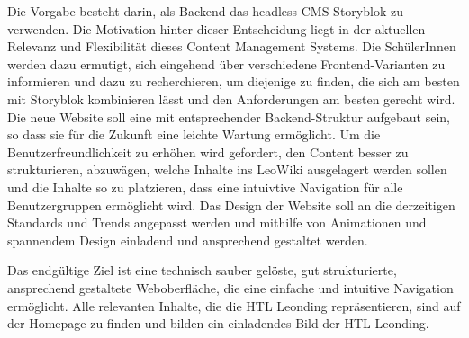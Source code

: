 Die Vorgabe besteht darin, als Backend das headless CMS Storyblok zu verwenden. Die Motivation hinter dieser Entscheidung 
liegt in der aktuellen Relevanz und Flexibilität dieses Content Management Systems. Die SchülerInnen werden dazu ermutigt, 
sich eingehend über verschiedene Frontend-Varianten zu informieren und dazu zu recherchieren, um diejenige zu finden, 
die sich am besten mit Storyblok kombinieren lässt und den Anforderungen am besten gerecht wird.
Die neue Website soll eine mit entsprechender Backend-Struktur aufgebaut sein, so dass
sie für die Zukunft eine leichte Wartung ermöglicht. 
Um die Benutzerfreundlichkeit zu erhöhen wird gefordert, den Content besser zu strukturieren,
abzuwägen, welche Inhalte ins LeoWiki ausgelagert werden sollen und die Inhalte so zu 
platzieren, dass eine intuivtive Navigation für alle Benutzergruppen ermöglicht wird.
Das Design der Website soll an die derzeitigen Standards und Trends angepasst werden
und mithilfe von Animationen und spannendem Design einladend und ansprechend gestaltet werden.

Das endgültige Ziel ist eine technisch sauber gelöste, gut strukturierte, ansprechend gestaltete
Weboberfläche, die eine einfache und intuitive Navigation ermöglicht. Alle relevanten Inhalte, die die HTL Leonding repräsentieren,
sind auf der Homepage zu finden und bilden ein einladendes Bild der HTL Leonding. 